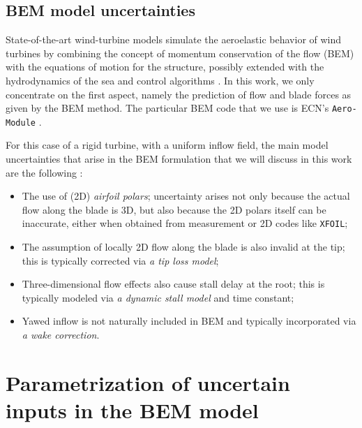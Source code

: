 \documentclass[review]{elsarticle}
\numberwithin{equation}{section}
\numberwithin{equation}{section}
\begin{document}
\subsection{BEM model uncertainties}
State-of-the-art wind-turbine models simulate the aeroelastic behavior of wind turbines by combining the concept of momentum conservation of the flow (BEM) with the equations of motion for the structure, possibly extended with the hydrodynamics of the sea and control algorithms \cite{Vorpahl2013}. In this work, we only concentrate on the first aspect, namely the prediction of flow and blade forces as given by the BEM method. The particular BEM code that we use is ECN's \texttt{Aero-Module} \cite{Boorsma2012}.

For this case of a rigid turbine, with a uniform inflow field, the main model uncertainties that arise in the BEM formulation that we will discuss in this work are the following \cite{Hansen1993}:
\begin{itemize}
\item The use of (2D) \textit{airfoil polars}; uncertainty arises not only because the actual flow along the blade is 3D, but also because the 2D polars itself can be inaccurate, either when obtained from measurement or 2D codes like \texttt{XFOIL};
\item The assumption of locally 2D flow along the blade is also invalid at the tip; this is typically corrected via \textit{a tip loss model};
\item Three-dimensional flow effects also cause stall delay at the root; this is typically modeled via \textit{a dynamic stall model }and time constant;
\item Yawed inflow is not naturally included in BEM and typically incorporated via \textit{a wake correction}.


\end{itemize}


\section{Parametrization of uncertain inputs in the BEM model}\label{sec:parameterization}
\end{document}
